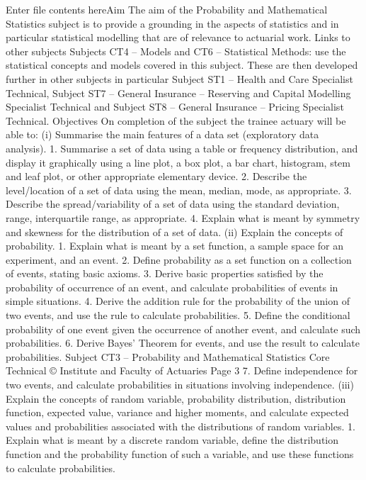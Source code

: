 Enter file contents hereAim  
The aim of the Probability and Mathematical Statistics subject is to provide a grounding in the aspects of statistics and in particular statistical modelling that are of relevance to actuarial work.  
Links to other subjects  
Subjects CT4 – Models and CT6 – Statistical Methods: use the statistical concepts and models covered in this subject.  These are then developed further in other subjects in particular Subject ST1 – Health and Care Specialist Technical, Subject ST7 – General Insurance – Reserving and Capital Modelling Specialist Technical and Subject ST8 – General Insurance – Pricing Specialist Technical.  
Objectives  
On completion of the subject the trainee actuary will be able to:  
(i) Summarise the main features of a data set (exploratory data analysis).  
 1. Summarise a set of data using a table or frequency distribution, and display it graphically using a line plot, a box plot, a bar chart, histogram, stem and leaf plot, or other appropriate elementary device.  
 2. Describe the level/location of a set of data using the mean, median, mode, as appropriate.  
 3. Describe the spread/variability of a set of data using the standard deviation, range, interquartile range, as appropriate.  
 4. Explain what is meant by symmetry and skewness for the distribution of a set of data.  
(ii) Explain the concepts of probability.  
 1. Explain what is meant by a set function, a sample space for an experiment, and an event.  
 2. Define probability as a set function on a collection of events, stating basic axioms.  
 3. Derive basic properties satisfied by the probability of occurrence of an event, and calculate probabilities of events in simple situations.  
 4. Derive the addition rule for the probability of the union of two events, and use the rule to calculate probabilities.  
 5. Define the conditional probability of one event given the occurrence of another event, and calculate such probabilities.  
 6. Derive Bayes’ Theorem for events, and use the result to calculate probabilities.  
 Subject CT3 – Probability and Mathematical Statistics Core Technical  
© Institute and Faculty of Actuaries Page 3 
 7. Define independence for two events, and calculate probabilities in situations involving independence.  
(iii) Explain the concepts of random variable, probability distribution, distribution function, expected value, variance and higher moments, and calculate expected values and probabilities associated with the distributions of random variables.  
 1. Explain what is meant by a discrete random variable, define the distribution function and the probability function of such a variable, and use these functions to calculate probabilities.  
